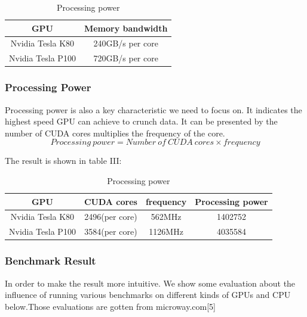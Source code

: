 \documentclass[conference]{IEEEtran}
\begin{document}
\begin{table}[H]
\caption{Processing power}
\begin{center}
\begin{tabular}{|c|c|}
\hline
\textbf{GPU} & \textbf{Memory bandwidth}\\
\hline
Nvidia Tesla K80 & 240GB/s per core \\
\hline
Nvidia Tesla P100 & 720GB/s per core\\
\hline
\end{tabular}
\end{center}
\end{table}




\subsubsection{Processing Power}
Processing power is also a key characteristic we need to focus on. It indicates the highest speed GPU can achieve to crunch data. It can be presented by the number of CUDA cores multiplies the frequency of the core.
$$Processing \ power = Number \ of \ CUDA \ cores \times frequency $$

The result is shown in table III:

\begin{table}[H]
\caption{Processing power}
\begin{center}
\begin{tabular}{|c|c|c|c|}
\hline
\textbf{GPU} & \textbf{CUDA cores}& \textbf{frequency}& \textbf{Processing power} \\
\hline
Nvidia Tesla K80 & 2496(per core)& 562MHz & 1402752 \\
\hline
Nvidia Tesla P100 & 3584(per core)& 1126MHz & 4035584 \\
\hline
\end{tabular}
\label{tab2}
\end{center}
\end{table}

\subsubsection{Benchmark Result}

In order to make the result more intuitive. We show some evaluation about the influence of running various benchmarks on different kinds of GPUs and CPU below.Those evaluations are gotten from microway.com[5]
\end{document}
